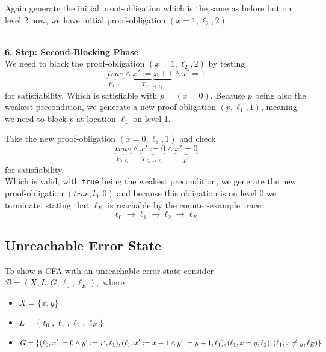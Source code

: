 \documentclass[11pt, a4paper, BCOR=10mm, ngerman, oneside]{scrbook}
\begin{document}
\hspace*{3cm}

Again generate the initial proof-obligation which is the same as before but on level 2 now, we have initial proof-obligation $(x = 1, \ell_2, 2)$ \\ \\ \par

\textbf{6. Step: Second-Blocking Phase} \\
We need to block the proof-obligation $(x = 1, \ell_2, 2)$ by testing
\begin{equation*}
\underbrace{true}_{F_{1, \ell_1}} \land \underbrace{x' := x + 1}_ {T_{\ell_1 \rightarrow \ell_2}} \land x' = 1
\end{equation*}
for satisfiability. Which is satisfiable with $ p = (x = 0)$. Because $p$ being also the weakest precondition, we generate a new proof-obligation $(p, \ell_1, 1)$, meaning we need to block $p$ at location $\ell_1$ on level 1. \par
Take the new proof-obligation $(x=0, \ell_1, 1)$ and check 
\begin{equation*}
\underbrace{true}_{F_{0, \ell_0}} \land \underbrace{x' := 0}_ {T_{\ell_{0} \rightarrow \ell_1}} \land \underbrace{x' = 0}_{p'}
\end{equation*}
for satisfiability. \\
Which is valid, with \texttt{true} being the weakest precondition, we generate the new proof-obligation $(true, l_0, 0)$ and because this obligation is on level 0 we terminate, stating that $\ell_E$ is reachable by the counter-example trace:
\begin{equation*}
\ell_0 \rightarrow \ell_1 \rightarrow \ell_2 \rightarrow \ell_E
\end{equation*}


\pagebreak

\subsection{Unreachable Error State}
To show a CFA with an unreachable error state consider $\mathcal{B} = (X, L, G, \ell_0, \ell_E),$ where
\begin{itemize}
\item $X = \{x, y\}$
\item $L = \{\ell_0, \ell_1, \ell_2, \ell_E\}$
\item $G = \{(\ell_0, x' := 0 \land y' := x', \ell_1), (\ell_1, x' := x+1 \land y' := y+1, \ell_1),\\ (\ell_1, x = y, \ell_2), (\ell_1, x \neq y, \ell_E) \}$
\end{itemize}
\end{document}
